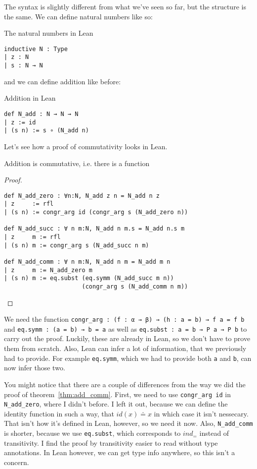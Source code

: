 \documentclass[a4paper, 12pt]{article}
\theoremstyle{changedot}
\theoremstyle{changedotbreak}
\theoremstyle{nonumberplain}
\newtheorem{proof}{Proof}
\begin{document}
The syntax is slightly different from what we've seen so far, but the structure is the same. We can define natural numbers like so:

\begin{definition}
  The natural numbers in Lean
\begin{verbatim}
inductive N : Type
| z : N
| s : N → N
\end{verbatim}
\end{definition}

and we can define addition like before:

\begin{definition}
  Addition in Lean
\begin{verbatim}
def N_add : N → N → N
| z := id
| (s n) := s ∘ (N_add n)
\end{verbatim}
\end{definition}

Let's see how a proof of commutativity looks in Lean.

\begin{theorem}
  Addition is commutative, i.e. there is a function 
\end{theorem}
\begin{proof}~
  
  \begin{verbatim}
def N_add_zero : ∀n:N, N_add z n = N_add n z
| z     := rfl
| (s n) := congr_arg id (congr_arg s (N_add_zero n))

def N_add_succ : ∀ n m:N, N_add n m.s = N_add n.s m
| z     m := rfl
| (s n) m := congr_arg s (N_add_succ n m)

def N_add_comm : ∀ n m:N, N_add n m = N_add m n
| z     m := N_add_zero m
| (s n) m := eq.subst (eq.symm (N_add_succ m n))
                      (congr_arg s (N_add_comm n m))
\end{verbatim}
\end{proof}

We need the function \texttt{congr_arg : (f : α → β) → (h : a = b) → f a = f b} and \texttt{eq.symm : (a = b) → b = a} as well as \texttt{eq.subst : a = b → P a → P b} to carry out the proof. Luckily, these are already in Lean, so we don't have to prove them from scratch. Also, Lean can infer a lot of information, that we previously had to provide. For example \texttt{eq.symm}, which we had to provide both \texttt{a} and \texttt{b}, can now infer those two.

You might notice that there are a couple of differences from the way we did the proof of theorem~\ref{thm:add_comm}. First, we need to use \texttt{congr_arg id} in \texttt{N_add_zero}, where I didn't before. I left it out, because we can define the identity function in such a way, that $id(x) \doteq x$ in which case it isn't nessecary. That isn't how it's defined in Lean, however, so we need it now. Also, \texttt{N_add_comm} is shorter, because we use \texttt{eq.subst}, which corresponds to $ind_{=}$ instead of transitivity. I find the proof by transitivity easier to read without type annotations. In Lean however, we can get type info anywhere, so this isn't a concern.
\end{document}

